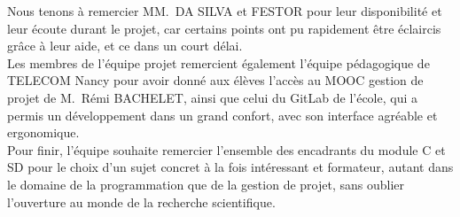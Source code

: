 \documentclass[light]{ceri}
\begin{document}
Nous tenons à remercier MM.~DA SILVA et FESTOR pour leur disponibilité et leur écoute durant le projet, car certains points ont pu rapidement être éclaircis grâce à leur aide, et ce dans un court délai. \\

Les membres de l'équipe projet remercient également l'équipe pédagogique de TELECOM Nancy pour avoir donné aux élèves l'accès au MOOC gestion de projet de M.~Rémi BACHELET, ainsi que celui du GitLab de l'école, qui a permis un développement dans un grand confort, avec son interface agréable et ergonomique. \\

Pour finir, l'équipe souhaite remercier l'ensemble des encadrants du module C et SD pour le choix d'un sujet concret à la fois intéressant et formateur, autant dans le domaine de la programmation que de la gestion de projet, sans oublier l'ouverture au monde de la recherche scientifique.

\newpage

\end{document}
